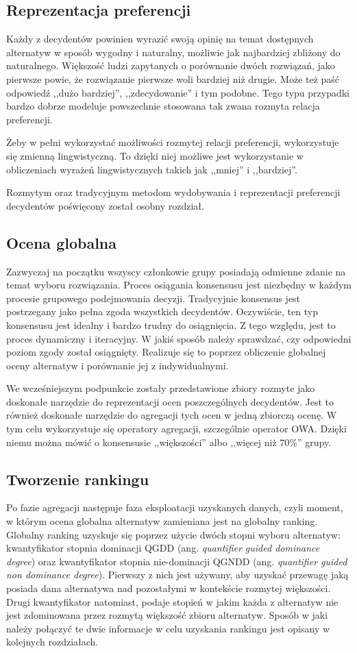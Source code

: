 \subsection{Reprezentacja preferencji}
Każdy z decydentów powinien wyrazić swoją opinię na temat dostępnych alternatyw 
w sposób wygodny i naturalny, możliwie jak najbardziej zbliżony do naturalnego. 
Większość ludzi zapytanych o porównanie dwóch rozwiązań, jako pierwsze powie, 
że rozwiązanie pierwsze woli bardziej niż drugie. Może też paść odpowiedź ,,dużo
bardziej'', ,,zdecydowanie'' i tym podobne. Tego typu przypadki bardzo dobrze
modeluje powszechnie stosowana tak zwana rozmyta relacja preferencji.

Żeby w pełni wykorzystać możliwości rozmytej relacji preferencji, wykorzystuje 
się zmienną lingwistyczną. To dzięki niej możliwe jest wykorzystanie w 
obliczeniach wyrażeń lingwistycznych takich jak ,,mniej'' i ,,bardziej''.

Rozmytym oraz tradycyjnym metodom wydobywania i reprezentacji preferencji 
decydentów poświęcony został osobny rozdział.

\subsection{Ocena globalna}
Zazwyczaj na początku wszyscy członkowie grupy posiadają odmienne zdanie na 
temat wyboru rozwiązania. Proces osiągania konsensusu jest niezbędny w każdym 
procesie grupowego podejmowania decyzji. Tradycyjnie konsensus jest postrzegany 
jako pełna zgoda wszystkich decydentów. Oczywiście, ten typ konsensusu jest 
idealny i bardzo trudny do osiągnięcia. Z tego względu, jest to proces 
dynamiczny i iteracyjny. W jakiś sposób należy sprawdzać, czy odpowiedni poziom 
zgody został osiągnięty. Realizuje się to poprzez obliczenie globalnej oceny 
alternatyw i porównanie jej z indywidualnymi.

We wcześniejszym podpunkcie zostały przedstawione zbiory rozmyte jako doskonałe
narzędzie do reprezentacji ocen poszczególnych decydentów. Jest to również
doskonałe narzędzie do agregacji tych ocen w jedną zbiorczą ocenę. W tym celu
wykorzystuje się operatory agregacji, szczególnie operator OWA. Dzięki niemu
można mówić o konsensusie ,,większości'' albo ,,więcej niż $70\%$''
grupy.

\subsection{Tworzenie rankingu}
Po fazie agregacji następuje faza eksploatacji uzyskanych danych, czyli moment,
w którym ocena globalna alternatyw zamieniana jest na globalny ranking. Globalny
ranking uzyskuje się poprzez użycie dwóch stopni wyboru alternatyw:
kwantyfikator stopnia dominacji QGDD (ang. \textit{quantifier guided dominance
degree}) oraz kwantyfikator stopnia nie-dominacji QGNDD (ang.
\textit{quantifier guided non dominance degree}). Pierwszy z nich jest używany,
aby uzyskać przewagę jaką posiada dana alternatywa nad pozostałymi w kontekście rozmytej większości. Drugi
kwantyfikator natomiast, podaje stopień w jakim każda z alternatyw nie jest
zdominowana przez rozmytą większość zbioru alternatyw. Sposób w jaki należy
połączyć te dwie informacje w celu uzyskania rankingu jest opisany w kolejnych
rozdziałach.
